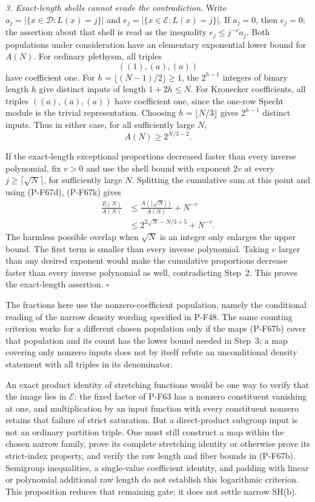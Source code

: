 \emph{3. Exact-length shells cannot evade the contradiction.}
Write $a_j=|\{x\in\mathcal D:L(x)=j\}|$ and
$e_j=|\{x\in\mathcal E:L(x)=j\}|$.  If $a_j=0$, then $e_j=0$;
the assertion about that shell is read as the inequality
$e_j\le j^{-v}a_j$.  Both populations under consideration have an
elementary exponential lower bound for $A(N)$.  For ordinary
plethysm, all triples
\[
                         ((1),(a),(a))
\]
have coefficient one.  For $h=\lfloor(N-1)/2\rfloor\ge1$, the
$2^{h-1}$ integers of binary length $h$ give distinct inputs of
length $1+2h\le N$.  For Kronecker coefficients, all triples
$((a),(a),(a))$ have coefficient one, since the one-row Specht
module is the trivial representation.  Choosing
$h=\lfloor N/3\rfloor$ gives $2^{h-1}$ distinct inputs.  Thus in
either case, for all sufficiently large $N$,
\[
                           A(N)\ge 2^{N/3-2}.
 \tag{P-F67k}
\]

If the exact-length exceptional proportions decreased faster than
every inverse polynomial, fix $v>0$ and use the shell bound with
exponent $2v$ at every $j\ge\lceil\sqrt N\rceil$, for sufficiently
large $N$.  Splitting the cumulative sum at this point and using
(P-F67d), (P-F67k) gives
\[
 \begin{split}
 \frac{E(N)}{A(N)}
 &\le\frac{A(\lfloor\sqrt N\rfloor)}{A(N)}+N^{-v}\\
 &\le 2^{2\sqrt N-N/3+5}+N^{-v}.
 \end{split}
 \tag{P-F67l}
\]
The harmless possible overlap when $\sqrt N$ is an integer only
enlarges the upper bound.  The first term is smaller than every
inverse polynomial.  Taking $v$ larger than any desired exponent
would make the cumulative proportions decrease faster than every
inverse polynomial as well, contradicting Step~2.  This proves the
exact-length assertion. \hfill$\square$

The fractions here use the nonzero-coefficient population, namely
the conditional reading of the narrow density wording specified in
P-F48.  The same counting criterion works for a different chosen
population only if the maps (P-F67b) cover that population and its
count has the lower bound needed in Step~3; a map covering only
nonzero inputs does not by itself refute an unconditional density
statement with all triples in its denominator.

An exact product identity of stretching functions would be one way
to verify that the image lies in $\mathcal E$: the fixed factor of
P-F63 has a nonzero constituent vanishing at one, and multiplication
by an input function with every constituent nonzero retains that
failure of strict saturation.  But a direct-product subgroup input
is not an ordinary partition triple.  One must still construct a
map within the chosen narrow family, prove its complete stretching
identity or otherwise prove its strict-index property, and verify
the raw length and fiber bounds in (P-F67b).  Semigroup inequalities,
a single-value coefficient identity, and padding with linear or
polynomial additional raw length do not establish this logarithmic
criterion.  This proposition reduces that remaining gate; it does
not settle narrow SH(b).
